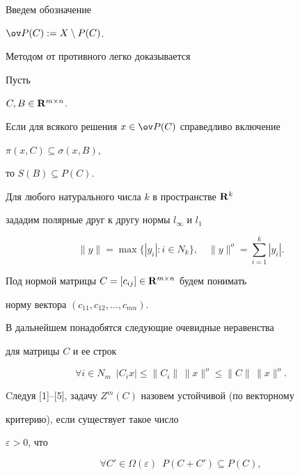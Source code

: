 Введем обозначение


$\ov P(C):=X\setminus P(C)$.


Методом от противного легко доказывается





\begin{lem}


Пусть


$C, B\in {\bold R}^{m\times n}$.


Если для всякого решения $x\in \ov P(C)$ справедливо включение


$\pi(x, C)\subseteq\sigma(x, B)$,


то $S(B)\subseteq P(C)$.


\end{lem}





Для любого натурального числа $k$ в пространстве ${\bold R}^k$


зададим полярные друг к другу нормы $l_\infty$ и $l_1$


$$


\| y\| = \max \{| y_i| : i\in N_k\},\quad


\| y\|^o = \sum_{i=1}^k| y_i|.


$$


Под нормой матрицы $C=[c_{ij}]\in {\bold R}^{m\times n}$ будем понимать


норму вектора $(c_{11}, c_{12},\dotsc, c_{mn})$.





В дальнейшем понадобятся следующие очевидные неравенства


для матрицы $C$ и ее строк


\begin{equation}


\forall i\in N_m\ \;


| C_ix | \le \| C_i\|\, \| x\|^o


\le \| C\|\, \| x\|^o.


\end{equation}


Cледуя [1]--[5], задачу $Z^m(C)$ назовем устойчивой (по векторному


критерию), если существует такое число


$\varepsilon > 0$, что


\begin{equation}


\forall C' \in \Omega(\varepsilon)\ \; P(C + C') \subseteq P(C),


\end{equation}


